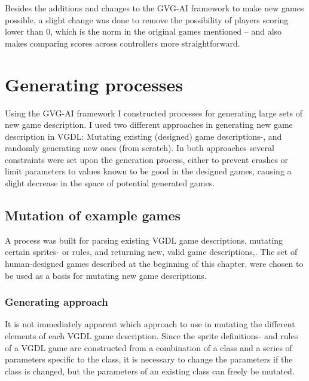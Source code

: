 \documentclass[a4paper,titlepage,final]{report}
\begin{document}
Besides the additions and changes to the GVG-AI framework to make new games possible, a slight change was done to remove the possibility of players scoring lower than 0, which is the norm in the original games mentioned -- and also makes comparing scores across controllers more straightforward.




\section{Generating processes}
\label{sec_task1genApproach}
Using the GVG-AI framework  I constructed processes for generating large sets of new game description.
I used two different approaches in generating new game description in VGDL: 
Mutating existing (designed) game descriptions-, and randomly generating new ones (from scratch).
In both approaches several constraints were set upon the generation process, either to prevent crashes or limit parameters to values known to be good in the designed games, causing a slight decrease in the space of potential generated games.

\subsection{Mutation of example games}
\label{ssec_task1mutation}
A process was built for parsing existing VGDL game descriptions, mutating certain sprites- or rules, and returning new, valid game descriptions,.
The set of human-designed games described at the beginning of this chapter, were chosen to be used as a basis for mutating new game descriptions.



\subsubsection*{Generating approach}
It is not immediately apparent which approach to use in mutating the different elements of  each VGDL game description.
Since the sprite definitions- and rules of a VGDL game are constructed from a combination of a class and a series of parameters specific to the class, it is necessary to change the parameters if the class is changed, but the parameters of an existing class can freely be mutated.
\end{document}
